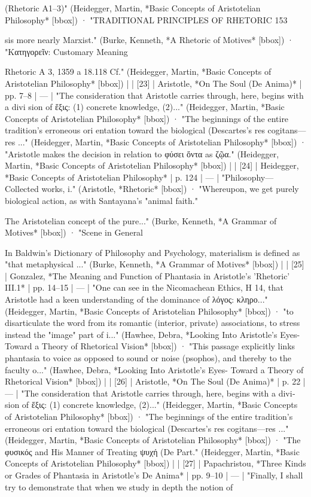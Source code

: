 (Rhetoric Α1–3)" (Heidegger, Martin, *Basic Concepts of Aristotelian Philosophy* [bbox]) · "TRADITIONAL PRINCIPLES OF RHETORIC 153

sis more nearly Marxist." (Burke, Kenneth, *A Rhetoric of Motives* [bbox]) · "Κατηγορεῖν: Customary Meaning

Rhetoric A 3, 1359 a 18.118 Cf." (Heidegger, Martin, *Basic Concepts of Aristotelian Philosophy* [bbox]) |
| [23] | Aristotle, *On The Soul (De Anima)* | pp. 7–8 | — | "The consideration that Aristotle carries through, here, begins with a divi­ sion of ἕξις: (1) concrete knowledge, (2)..." (Heidegger, Martin, *Basic Concepts of Aristotelian Philosophy* [bbox]) · "The beginnings of the entire tradition’s erroneous ori­ entation toward the biological (Descartes’s res cogitans—res ..." (Heidegger, Martin, *Basic Concepts of Aristotelian Philosophy* [bbox]) · "Aristotle makes the decision in relation to φύσει ὄντα as ζῷα." (Heidegger, Martin, *Basic Concepts of Aristotelian Philosophy* [bbox]) |
| [24] | Heidegger, *Basic Concepts of Aristotelian Philosophy* | p. 124 | — | "Philosophy—Collected works, i." (Aristotle, *Rhetoric* [bbox]) · "Whereupon, we get purely biological action, as with Santayana's "animal faith."

The Aristotelian concept of the pure..." (Burke, Kenneth, *A Grammar of Motives* [bbox]) · "Scene in General

In Baldwin's Dictionary of Philosophy and Psychology, materialism is defined as "that metaphysical ..." (Burke, Kenneth, *A Grammar of Motives* [bbox]) |
| [25] | Gonzalez, *The Meaning and Function of Phantasia in Aristotle's 'Rhetoric' III.1* | pp. 14–15 | — | "One can see in the Nicomachean Ethics, Η 14, that Aristotle had a keen understanding of the dominance of λόγος: κληρο..." (Heidegger, Martin, *Basic Concepts of Aristotelian Philosophy* [bbox]) · "to disarticulate the word from its romantic (interior, private) associations, to stress instead the "image" part of i..." (Hawhee, Debra, *Looking Into Aristotle's Eyes- Toward a Theory of Rhetorical Vision* [bbox]) · "This passage explicitly links phantasia to voice as opposed to sound or noise (psophos), and thereby to the faculty o..." (Hawhee, Debra, *Looking Into Aristotle's Eyes- Toward a Theory of Rhetorical Vision* [bbox]) |
| [26] | Aristotle, *On The Soul (De Anima)* | p. 22 | — | "The consideration that Aristotle carries through, here, begins with a divi­ sion of ἕξις: (1) concrete knowledge, (2)..." (Heidegger, Martin, *Basic Concepts of Aristotelian Philosophy* [bbox]) · "The beginnings of the entire tradition’s erroneous ori­ entation toward the biological (Descartes’s res cogitans—res ..." (Heidegger, Martin, *Basic Concepts of Aristotelian Philosophy* [bbox]) · "The φυσικός and His Manner of Treating ψυχή (De Part." (Heidegger, Martin, *Basic Concepts of Aristotelian Philosophy* [bbox]) |
| [27] | Papachristou, *Three Kinds or Grades of Phantasia in Aristotle's De Anima* | pp. 9–10 | — | "Finally, I shall try to demonstrate that when we study in depth the notion of

